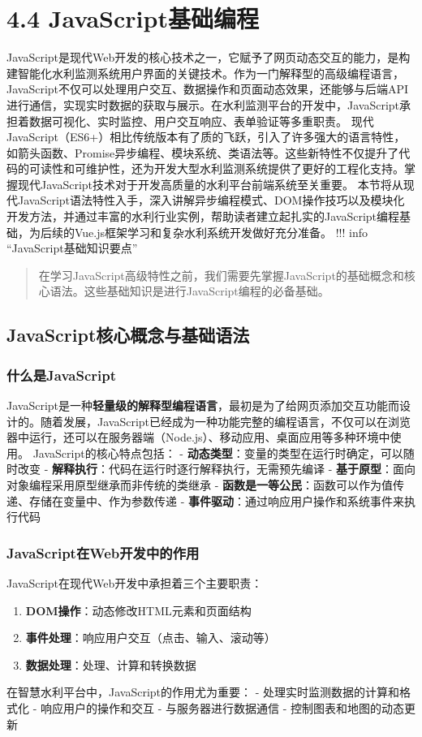 \section{4.4 JavaScript基础编程}\label{javascriptux57faux7840ux7f16ux7a0b}
JavaScript是现代Web开发的核心技术之一，它赋予了网页动态交互的能力，是构建智能化水利监测系统用户界面的关键技术。作为一门解释型的高级编程语言，JavaScript不仅可以处理用户交互、数据操作和页面动态效果，还能够与后端API进行通信，实现实时数据的获取与展示。在水利监测平台的开发中，JavaScript承担着数据可视化、实时监控、用户交互响应、表单验证等多重职责。
现代JavaScript（ES6+）相比传统版本有了质的飞跃，引入了许多强大的语言特性，如箭头函数、Promise异步编程、模块系统、类语法等。这些新特性不仅提升了代码的可读性和可维护性，还为开发大型水利监测系统提供了更好的工程化支持。掌握现代JavaScript技术对于开发高质量的水利平台前端系统至关重要。
本节将从现代JavaScript语法特性入手，深入讲解异步编程模式、DOM操作技巧以及模块化开发方法，并通过丰富的水利行业实例，帮助读者建立起扎实的JavaScript编程基础，为后续的Vue.js框架学习和复杂水利系统开发做好充分准备。
!!! info ``JavaScript基础知识要点'' \begin{quote}

在学习JavaScript高级特性之前，我们需要先掌握JavaScript的基础概念和核心语法。这些基础知识是进行JavaScript编程的必备基础。 
\end{quote}
\subsection{JavaScript核心概念与基础语法}\label{javascriptux6838ux5fc3ux6982ux5ff5ux4e0eux57faux7840ux8bedux6cd5}
\subsubsection{什么是JavaScript}\label{ux4ec0ux4e48ux662fjavascript}
JavaScript是一种\textbf{轻量级的解释型编程语言}，最初是为了给网页添加交互功能而设计的。随着发展，JavaScript已经成为一种功能完整的编程语言，不仅可以在浏览器中运行，还可以在服务器端（Node.js）、移动应用、桌面应用等多种环境中使用。
JavaScript的核心特点包括： - \textbf{动态类型}：变量的类型在运行时确定，可以随时改变 - \textbf{解释执行}：代码在运行时逐行解释执行，无需预先编译 -
\textbf{基于原型}：面向对象编程采用原型继承而非传统的类继承 - \textbf{函数是一等公民}：函数可以作为值传递、存储在变量中、作为参数传递 - \textbf{事件驱动}：通过响应用户操作和系统事件来执行代码
\subsubsection{JavaScript在Web开发中的作用}\label{javascriptux5728webux5f00ux53d1ux4e2dux7684ux4f5cux7528}
JavaScript在现代Web开发中承担着三个主要职责： \begin{enumerate} \def\labelenumi{\arabic{enumi}.} \tightlist \item
\textbf{DOM操作}：动态修改HTML元素和页面结构 \item \textbf{事件处理}：响应用户交互（点击、输入、滚动等） \item \textbf{数据处理}：处理、计算和转换数据 \end{enumerate}
在智慧水利平台中，JavaScript的作用尤为重要： - 处理实时监测数据的计算和格式化 - 响应用户的操作和交互 - 与服务器进行数据通信 - 控制图表和地图的动态更新
